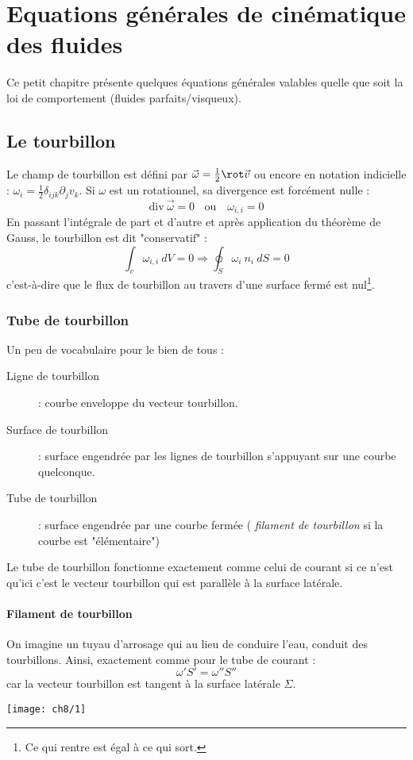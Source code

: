 \chapter{Equations générales de cinématique des fluides}
Ce petit chapitre présente quelques équations générales valables quelle que
soit la loi de comportement (fluides parfaits/visqueux).

\section{Le tourbillon}
Le champ de tourbillon est défini par $\vec{\omega} = \frac{1}{2}\rot \vec{v}$ 
ou encore en notation indicielle : $\omega_i = \frac{1}{2}\delta_{ijk}\partial_j
v_k$. Si $\omega$ est un rotationnel, sa divergence est forcément nulle :
\begin{equation}
\text{div}\ \vec\omega = 0\ \ \ \ \text{ou }\ \ \ \omega_{i,i} = 0
\end{equation}
En passant l'intégrale de part et d'autre et après application du théorème de 
Gauss, le tourbillon est dit "conservatif" : 
\begin{equation}
\int_v \omega_{i,i}\ dV = 0 \Rightarrow \oint_S \omega_i\ n_i\ dS = 0
\end{equation}
c'est-à-dire que le flux de tourbillon au travers d'une surface fermé est 
nul\footnote{Ce qui rentre est égal à ce qui sort.}.

	\subsection{Tube de tourbillon}
	Un peu de vocabulaire pour le bien de tous :
	\begin{description}
	\item[Ligne de tourbillon] : courbe enveloppe du vecteur tourbillon.
	\item[Surface de tourbillon] : surface engendrée par les lignes de 
	tourbillon s'appuyant sur une courbe quelconque.
	\item[Tube de tourbillon] : surface engendrée par une courbe fermée (
	\textit{filament de tourbillon} si la courbe est "élémentaire")
	\end{description}
	Le tube de tourbillon fonctionne exactement comme celui de courant si ce 
	n'est qu'ici c'est le vecteur tourbillon qui est parallèle à la surface 
	latérale.
	
		\subsubsection{Filament de tourbillon}
		On imagine un tuyau d'arrosage qui au lieu de conduire l'eau, conduit 
		des tourbillons. Ainsi, exactement comme pour le tube de courant :
		\begin{equation}
		\omega'S' = \omega''S''
		\end{equation}
		car la vecteur tourbillon est tangent à la surface latérale $\Sigma$.\\
\begin{center}
\texttt{[image: ch8/1]}
\end{center}
		
